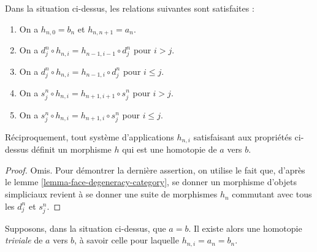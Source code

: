 \begin{lemma}
\label{lemma-relations-homotopy}
Dans la situation ci-dessus, les relations suivantes sont satisfaites :
\begin{enumerate}
\item On a $h_{n, 0} = b_n$ et $h_{n, n + 1} = a_n$.
\item On a $d^n_j \circ h_{n, i} = h_{n - 1, i - 1} \circ d^n_j$
pour $i > j$.
\item On a $d^n_j \circ h_{n, i} = h_{n - 1, i} \circ d^n_j$
pour $i \leq j$.
\item On a $s^n_j \circ h_{n, i} = h_{n + 1, i + 1} \circ s^n_j$
pour $i > j$.
\item On a $s^n_j \circ h_{n, i} = h_{n + 1, i} \circ s^n_j$
pour $i \leq j$.
\end{enumerate}
Réciproquement, tout système d'applications $h_{n, i}$ satisfaisant aux
propriétés ci-dessus définit un morphisme
$h$ qui est une homotopie de $a$ vers $b$.
\end{lemma}

\begin{proof}
Omis. Pour démontrer la dernière assertion, on utilise le fait que,
d'après le lemme \ref{lemma-face-degeneracy-category},
se donner un morphisme d'objets simpliciaux revient à se donner
une suite de morphismes $h_n$ commutant avec tous les $d^n_j$ et $s^n_j$.
\end{proof}

\begin{example}
\label{example-trivial-homotopy}
Supposons, dans la situation ci-dessus, que $a = b$. Il existe alors une
homotopie {\it triviale} de $a$ vers $b$, à savoir celle pour laquelle
$h_{n, i} = a_n = b_n$.
\end{example}

